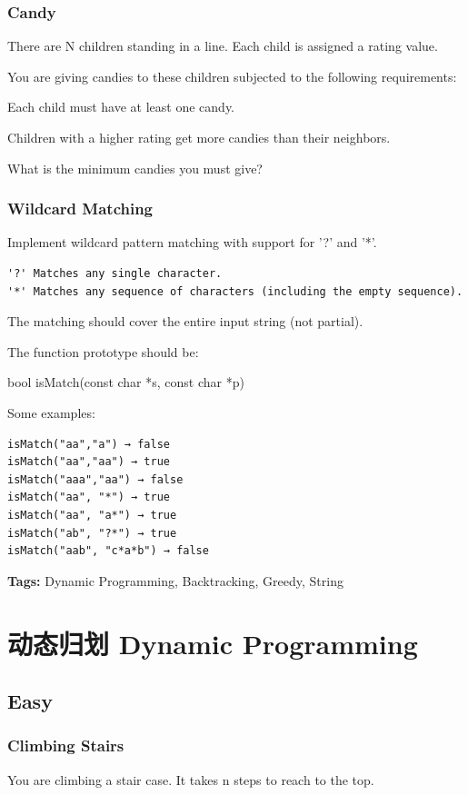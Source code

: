 \documentclass[12pt]{book}
\begin{document}
\subsection{Candy}
\label{sec-13-2-2}
There are N children standing in a line. Each child is assigned a rating value.

You are giving candies to these children subjected to the following requirements:

Each child must have at least one candy.

Children with a higher rating get more candies than their neighbors.

What is the minimum candies you must give?
\subsection{Wildcard Matching}
\label{sec-13-2-3}
Implement wildcard pattern matching with support for '?' and '*'.
\lstset{language=java,label= ,caption= ,numbers=none}
\begin{lstlisting}
'?' Matches any single character.
'*' Matches any sequence of characters (including the empty sequence).
\end{lstlisting}

The matching should cover the entire input string (not partial).

The function prototype should be:

bool isMatch(const char *s, const char *p)

Some examples:
\lstset{language=java,label= ,caption= ,numbers=none}
\begin{lstlisting}
isMatch("aa","a") → false
isMatch("aa","aa") → true
isMatch("aaa","aa") → false
isMatch("aa", "*") → true
isMatch("aa", "a*") → true
isMatch("ab", "?*") → true
isMatch("aab", "c*a*b") → false
\end{lstlisting}
\textbf{Tags:} Dynamic Programming, Backtracking, Greedy, String

\chapter{动态归划 Dynamic Programming}
\label{sec-14}
\section{Easy}
\label{sec-14-1}
\subsection{Climbing Stairs}
\label{sec-14-1-1}
You are climbing a stair case. It takes n steps to reach to the top.
\end{document}
